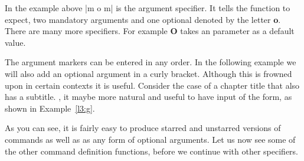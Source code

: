 In the example above |{m o m}| is the argument specifier. It tells the function  to expect, two mandatory arguments and one optional denoted by the letter \textbf{o}. There are many more specifiers. For example \textbf{O} takes an parameter as a default value.


The argument markers can be entered in any order. In the following example we will also add an optional argument in a curly bracket. Although this is frowned upon in certain contexts it is useful. Consider the case of a chapter title that also has a subtitle. , it maybe more natural and useful to have input of the form, as shown in Example~\ref{l3:g}. 



As you can see, it is fairly easy to produce starred and unstarred versions of commands as well as as any form of optional arguments. Let us now see some of the other command definition functions, before we continue with other specifiers.


